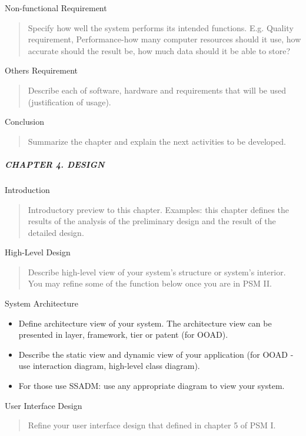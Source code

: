 Non-functional Requirement

\begin{quote}
Specify how well the system performs its intended functions. E.g.
Quality requirement, Performance-how many computer resources should it
use, how accurate should the result be, how much data should it be able
to store?
\end{quote}

Others Requirement

\begin{quote}
Describe each of software, hardware and requirements that will be used
(justification of usage).
\end{quote}

Conclusion

\begin{quote}
Summarize the chapter and explain the next activities to be developed.
\end{quote}

\subparagraph{CHAPTER 4. DESIGN}\label{chapter-4.-design}

Introduction

\begin{quote}
Introductory preview to this chapter. Examples: this chapter defines the
results of the analysis of the preliminary design and the result of the
detailed design.
\end{quote}

High-Level Design

\begin{quote}
Describe high-level view of your system's structure or system's
interior. You may refine some of the function below once you are in PSM
II.
\end{quote}

System Architecture

\begin{itemize}
\item
  Define architecture view of your system. The architecture view can be
  presented in layer, framework, tier or patent (for OOAD).
\item
  Describe the static view and dynamic view of your application (for
  OOAD - use interaction diagram, high-level class diagram).
\item
  For those use SSADM: use any appropriate diagram to view your system.
\end{itemize}

User Interface Design

\begin{quote}
Refine your user interface design that defined in chapter 5 of PSM I.
\end{quote}

